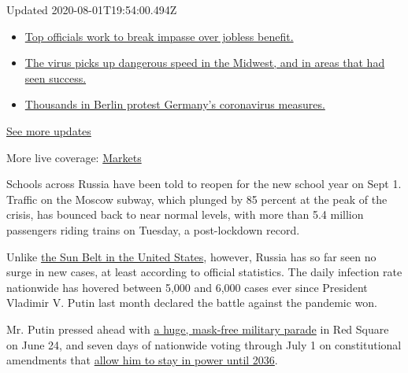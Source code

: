 Updated 2020-08-01T19:54:00.494Z

\begin{itemize}
\tightlist
\item
  \href{https://www.nytimes3xbfgragh.onion/2020/08/01/world/coronavirus-covid-19.html?action=click\&pgtype=Article\&state=default\&region=MAIN_CONTENT_1\&context=storylines_live_updates\#link-3ac56579}{Top
  officials work to break impasse over jobless benefit.}
\item
  \href{https://www.nytimes3xbfgragh.onion/2020/08/01/world/coronavirus-covid-19.html?action=click\&pgtype=Article\&state=default\&region=MAIN_CONTENT_1\&context=storylines_live_updates\#link-8796723}{The
  virus picks up dangerous speed in the Midwest, and in areas that had
  seen success.}
\item
  \href{https://www.nytimes3xbfgragh.onion/2020/08/01/world/coronavirus-covid-19.html?action=click\&pgtype=Article\&state=default\&region=MAIN_CONTENT_1\&context=storylines_live_updates\#link-25930521}{Thousands
  in Berlin protest Germany's coronavirus measures.}
\end{itemize}

\href{https://www.nytimes3xbfgragh.onion/2020/08/01/world/coronavirus-covid-19.html?action=click\&pgtype=Article\&state=default\&region=MAIN_CONTENT_1\&context=storylines_live_updates}{See
more updates}

More live coverage:
\href{https://www.nytimes3xbfgragh.onion/live/2020/07/31/business/stock-market-today-coronavirus?action=click\&pgtype=Article\&state=default\&region=MAIN_CONTENT_1\&context=storylines_live_updates}{Markets}

Schools across Russia have been told to reopen for the new school year
on Sept 1. Traffic on the Moscow subway, which plunged by 85 percent at
the peak of the crisis, has bounced back to near normal levels, with
more than 5.4 million passengers riding trains on Tuesday, a
post-lockdown record.

Unlike
\href{https://www.nytimes3xbfgragh.onion/2020/06/14/us/coronavirus-united-states.html}{the
Sun Belt in the United States}, however, Russia has so far seen no surge
in new cases, at least according to official statistics. The daily
infection rate nationwide has hovered between 5,000 and 6,000 cases ever
since President Vladimir V. Putin last month declared the battle against
the pandemic won.

Mr. Putin pressed ahead with
\href{https://www.nytimes3xbfgragh.onion/2020/06/24/world/europe/russia-coronavirus-parade.html}{a
huge, mask-free military parade} in Red Square on June 24, and seven
days of nationwide voting through July 1 on constitutional amendments
that
\href{https://www.nytimes3xbfgragh.onion/2020/07/01/world/europe/putin-referendum-vote-russia.html}{allow
him to stay in power until 2036}.


